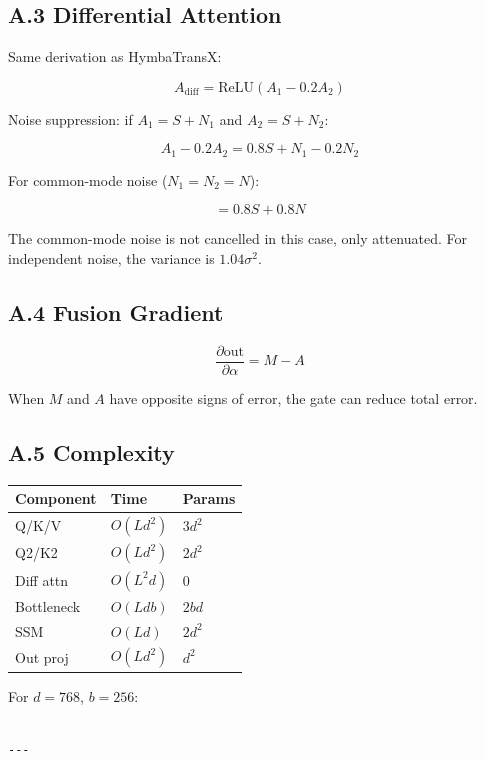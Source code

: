 \subsection{A.3 Differential Attention}

Same derivation as HymbaTransX:

\[
A_\text{diff} = \text{ReLU}(A_1 - 0.2 A_2)
\tag{A.4}
\]

Noise suppression: if $A_1 = S + N_1$ and $A_2 = S + N_2$:

\[
A_1 - 0.2 A_2 = 0.8 S + N_1 - 0.2 N_2
\tag{A.5}
\]

For common-mode noise ($N_1 = N_2 = N$):

\[
= 0.8 S + 0.8 N
\tag{A.6}
\]

The common-mode noise is not cancelled in this case, only attenuated. For 
independent noise, the variance is $1.04 \sigma^2$.

\subsection{A.4 Fusion Gradient}

\[
\frac{\partial \text{out}}{\partial \alpha} = M - A
\tag{A.7}
\]

When $M$ and $A$ have opposite signs of error, the gate can reduce total 
error.

\subsection{A.5 Complexity}

\begin{table}[H]
\centering
\small
\begin{tabular}{lll}
\toprule
\textbf{Component} & \textbf{Time} & \textbf{Params} \\
\midrule
Q/K/V & $O(L d^2)$ & $3 d^2$ \\
Q2/K2 & $O(L d^2)$ & $2 d^2$ \\
Diff attn & $O(L^2 d)$ & 0 \\
Bottleneck & $O(L d b)$ & $2 b d$ \\
SSM & $O(L d)$ & $2 d^2$ \\
Out proj & $O(L d^2)$ & $d^2$ \\
\bottomrule
\end{tabular}
\end{table}

For $d = 768$, $b = 256$:

\begin{lstlisting}

---
\end{lstlisting}

